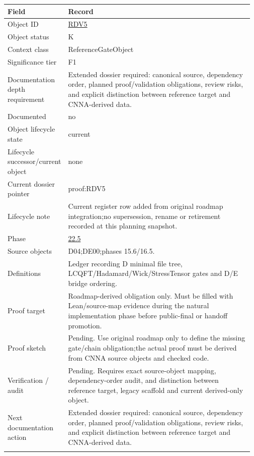 \begin{longtable}{L{0.16\linewidth} L{0.81\linewidth}}
\hline
\textbf{Field} & \textbf{Record}\\
\hline
Object ID & \hyperlink{object-row-RDV5}{RDV5}\\
\hline\addlinespace[0.20em]
Object status & K\\
\hline\addlinespace[0.20em]
Context class & ReferenceGateObject\\
\hline\addlinespace[0.20em]
Significance tier & F1\\
\hline\addlinespace[0.20em]
Documentation depth requirement & Extended dossier required: canonical source, dependency order, planned proof/\allowbreak{}validation obligations, review risks, and explicit distinction between reference target and CNNA-derived data.\\
\hline\addlinespace[0.20em]
Documented & no\\
\hline\addlinespace[0.20em]
Object lifecycle state & current\\
\hline\addlinespace[0.20em]
Lifecycle successor/\allowbreak{}current object & none\\
\hline\addlinespace[0.20em]
Current dossier pointer & proof:RDV5\\
\hline\addlinespace[0.20em]
Lifecycle note & Current register row added from original roadmap integration;\newline no supersession, rename or retirement recorded at this planning snapshot.\\
\hline\addlinespace[0.20em]
Phase & \hyperlink{phase-row-22-5}{22.5}\\
\hline\addlinespace[0.20em]
Source objects & D04;\newline DE00;\newline phases 15.6/\allowbreak{}16.5.\\
\hline\addlinespace[0.20em]
Definitions & Ledger recording D minimal file tree, LCQFT/\allowbreak{}Hadamard/\allowbreak{}Wick/\allowbreak{}StressTensor gates and D/\allowbreak{}E bridge ordering.\\
\hline\addlinespace[0.20em]
Proof target & Roadmap-derived obligation only. Must be filled with Lean/\allowbreak{}source-map evidence during the natural implementation phase before public-final or handoff promotion.\\
\hline\addlinespace[0.20em]
Proof sketch & Pending. Use original roadmap only to define the missing gate/\allowbreak{}chain obligation;\newline the actual proof must be derived from CNNA source objects and checked code.\\
\hline\addlinespace[0.20em]
Verification /\allowbreak{} audit & Pending. Requires exact source-object mapping, dependency-order audit, and distinction between reference target, legacy scaffold and current derived-only object.\\
\hline\addlinespace[0.20em]
Next documentation action & Extended dossier required: canonical source, dependency order, planned proof/\allowbreak{}validation obligations, review risks, and explicit distinction between reference target and CNNA-derived data.\\
\hline\addlinespace[0.20em]
\end{longtable}
